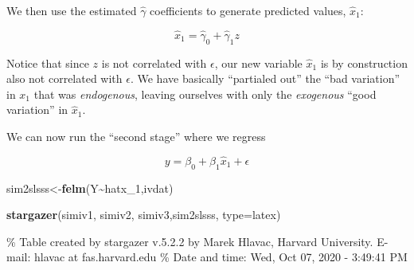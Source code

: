 \documentclass[
]{article}
\newenvironment{Shaded}{\begin{snugshade}}{\end{snugshade}}
\newcommand{\DataTypeTok}[1]{\textcolor[rgb]{0.13,0.29,0.53}{#1}}
\newcommand{\DecValTok}[1]{\textcolor[rgb]{0.00,0.00,0.81}{#1}}
\newcommand{\KeywordTok}[1]{\textcolor[rgb]{0.13,0.29,0.53}{\textbf{#1}}}
\newcommand{\NormalTok}[1]{#1}
\newcommand{\OperatorTok}[1]{\textcolor[rgb]{0.81,0.36,0.00}{\textbf{#1}}}
\newcommand{\StringTok}[1]{\textcolor[rgb]{0.31,0.60,0.02}{#1}}
\begin{document}
We then use the estimated \(\hat{\gamma}\) coefficients to generate
predicted values, \(\hat{x}_1\):

\[
\hat{x}_1=\hat{\gamma}_0+\hat{\gamma}_1z
\]

\begin{Shaded}
\end{Shaded}

Notice that since \(z\) is not correlated with \(\epsilon\), our new
variable \(\hat{x}_1\) is by construction also not correlated with
\(\epsilon\). We have basically ``partialed out'' the ``bad variation''
in \(x_1\) that was \textit{endogenous}, leaving ourselves with only the
\textit{exogenous} ``good variation'' in \(\hat{x}_1\).

We can now run the ``second stage'' where we regress

\[
y=\beta_0+\beta_1\hat{x}_1+\epsilon
\]

\begin{Shaded}
\begin{Highlighting}[]
\NormalTok{sim2slsss\textless{}{-}}\KeywordTok{felm}\NormalTok{(Y}\OperatorTok{\textasciitilde{}}\NormalTok{hatx\_}\DecValTok{1}\NormalTok{,ivdat)}

\KeywordTok{stargazer}\NormalTok{(simiv1, simiv2, simiv3,sim2slsss,  }\DataTypeTok{type=}\StringTok{\textquotesingle{}latex\textquotesingle{}}\NormalTok{)}
\end{Highlighting}
\end{Shaded}

\% Table created by stargazer v.5.2.2 by Marek Hlavac, Harvard
University. E-mail: hlavac at fas.harvard.edu \% Date and time: Wed, Oct
07, 2020 - 3:49:41 PM
\end{document}
